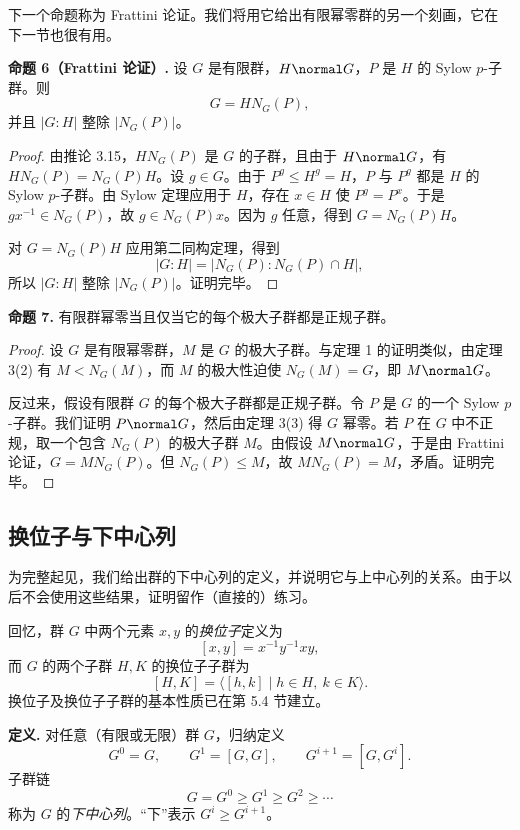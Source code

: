 下一个命题称为 Frattini 论证。我们将用它给出有限幂零群的另一个刻画，它在下一节也很有用。

\medskip
\noindent\textbf{命题 6（Frattini 论证）.} 设 $G$ 是有限群，$H\normal G$，$P$ 是 $H$ 的 Sylow $p$-子群。则
\[
  G=HN_G(P),
\]
并且 $|G:H|$ 整除 $|N_G(P)|$。

\begin{proof}
由推论 3.15，$HN_G(P)$ 是 $G$ 的子群，且由于 $H\normal G$，有 $HN_G(P)=N_G(P)H$。设 $g\in G$。由于 $P^g\leq H^g=H$，$P$ 与 $P^g$ 都是 $H$ 的 Sylow $p$-子群。由 Sylow 定理应用于 $H$，存在 $x\in H$ 使 $P^g=P^x$。于是 $gx^{-1}\in N_G(P)$，故 $g\in N_G(P)x$。因为 $g$ 任意，得到 $G=N_G(P)H$。

对 $G=N_G(P)H$ 应用第二同构定理，得到
\[
  |G:H|=|N_G(P):N_G(P)\cap H|,
\]
所以 $|G:H|$ 整除 $|N_G(P)|$。证明完毕。
\end{proof}

\medskip
\noindent\textbf{命题 7.} 有限群幂零当且仅当它的每个极大子群都是正规子群。

\begin{proof}
设 $G$ 是有限幂零群，$M$ 是 $G$ 的极大子群。与定理 1 的证明类似，由定理 3(2) 有 $M<N_G(M)$，而 $M$ 的极大性迫使 $N_G(M)=G$，即 $M\normal G$。

反过来，假设有限群 $G$ 的每个极大子群都是正规子群。令 $P$ 是 $G$ 的一个 Sylow $p$-子群。我们证明 $P\normal G$，然后由定理 3(3) 得 $G$ 幂零。若 $P$ 在 $G$ 中不正规，取一个包含 $N_G(P)$ 的极大子群 $M$。由假设 $M\normal G$，于是由 Frattini 论证，$G=MN_G(P)$。但 $N_G(P)\leq M$，故 $MN_G(P)=M$，矛盾。证明完毕。
\end{proof}

\subsection*{换位子与下中心列}

为完整起见，我们给出群的下中心列的定义，并说明它与上中心列的关系。由于以后不会使用这些结果，证明留作（直接的）练习。

回忆，群 $G$ 中两个元素 $x,y$ 的\emph{换位子}定义为
\[
  [x,y]=x^{-1}y^{-1}xy,
\]
而 $G$ 的两个子群 $H,K$ 的换位子子群为
\[
  [H,K]=\langle [h,k]\mid h\in H,\ k\in K\rangle.
\]
换位子及换位子子群的基本性质已在第 5.4 节建立。

\medskip
\noindent\textbf{定义.} 对任意（有限或无限）群 $G$，归纳定义
\[
  G^0=G,
  \qquad
  G^1=[G,G],
  \qquad
  G^{i+1}=[G,G^i].
\]
子群链
\[
  G=G^0\geq G^1\geq G^2\geq\cdots
\]
称为 $G$ 的\emph{下中心列}。“下”表示 $G^i\geq G^{i+1}$。

